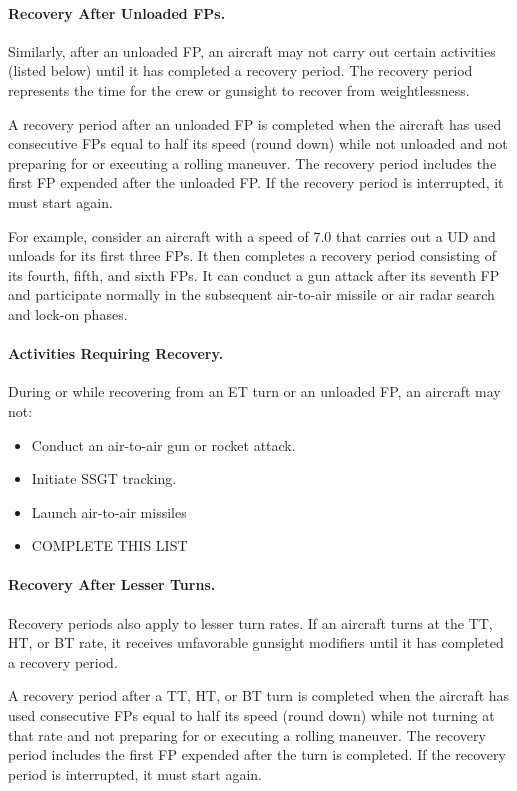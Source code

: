{\paragraph{Recovery After Unloaded FPs.} Similarly, after an unloaded FP, an aircraft may not carry out certain activities (listed below) until it has completed a recovery period. The recovery period represents the time for the crew or gunsight to recover from weightlessness.

A recovery period after an unloaded FP is completed when the aircraft has used consecutive FPs equal to half its speed (round down) while not unloaded and not preparing for or executing a rolling maneuver. The recovery period includes the first FP expended after the unloaded FP. If the recovery period is interrupted, it must start again.

For example, consider an aircraft with a speed of 7.0 that carries out a UD and unloads for its first three FPs. It then completes a recovery period consisting of its fourth, fifth, and sixth FPs. It can conduct a gun attack after its seventh FP and participate normally in the subsequent air-to-air missile or air radar search and lock-on phases.

\paragraph{Activities Requiring Recovery.}
During or while recovering from an ET turn or an unloaded FP, an aircraft may not:
\begin{itemize}
    \item Conduct an air-to-air gun or rocket attack.
    \item Initiate SSGT tracking.
    \item Launch air-to-air missiles
    \item COMPLETE THIS LIST
\end{itemize}

\paragraph{Recovery After Lesser Turns.} Recovery periods also apply to lesser turn rates. If an aircraft turns at the TT, HT, or BT rate, it receives unfavorable gunsight modifiers until it has completed a recovery period.

A recovery period after a TT, HT, or BT turn is completed when the aircraft has used consecutive FPs equal to half its speed (round down) while not turning at that rate and not preparing for or executing a rolling maneuver. The recovery period includes the first FP expended after the turn is completed. If the recovery period is interrupted, it must start again.

}
